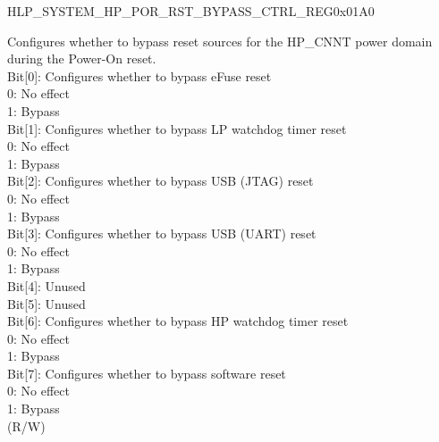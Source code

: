 \begin{register}{H}{LP\_SYSTEM\_HP\_POR\_RST\_BYPASS\_CTRL\_REG}{0x01A0}\label{regdesc:LPSYSTEMHPPORRSTBYPASSCTRLREG}
%
%
%
%
\regnewline%
\begin{regdesc}\begin{reglist}
\label{fielddesc:LPSYSTEMHPPOCNNTRSTNBYPASSCTRL}\item [LP\_SYSTEM\_HP\_PO\_CNNT\_RSTN\_BYPASS\_CTRL] Configures whether to bypass reset sources for the HP\_CNNT power domain during the Power-On reset.\\
Bit[0]: Configures whether to bypass eFuse reset\\
0: No effect\\
1: Bypass\\
Bit[1]: Configures whether to bypass LP watchdog timer reset\\
0: No effect\\
1: Bypass\\
Bit[2]: Configures whether to bypass USB (JTAG) reset\\
0: No effect\\
1: Bypass\\
Bit[3]: Configures whether to bypass USB (UART) reset\\
0: No effect\\
1: Bypass\\
Bit[4]: Unused\\
Bit[5]: Unused\\
Bit[6]: Configures whether to bypass HP watchdog timer reset\\
0: No effect\\
1: Bypass\\
Bit[7]: Configures whether to bypass software reset\\
0: No effect\\
1: Bypass\\
(R/W)
\item [Continued on the next page...]
\end{reglist}\end{regdesc}
\end{register}
\addtocounter{Regfloat}{-1}


